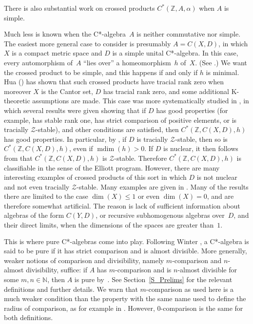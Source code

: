 \documentclass[10pt]{amsart}
\numberwithin{equation}{section}
\theoremstyle{definition}
\newcommand{\af}{\alpha}
\newcommand{\Z}{{\mathbb{Z}}}
\newcommand{\mdim}{{\operatorname{mdim}}}
\newcommand{\cZ}{{\mathcal{Z}}}
\newcommand{\ifo}{if and only if}
\newcommand{\ca}{C*-algebra}
\newcommand{\cms}{compact metric space}
\newcommand{\hme}{homeomorphism}
\begin{document}
There is also substantial work on crossed products
$C^* (\Z, A, \af)$ when $A$ is simple.

Much less is known when the \ca~$A$ is
neither commutative nor simple.
The easiest more general
case to consider is presumably $A = C (X, D)$, in which $X$
is a \cms{} and $D$ is a simple unital \ca.
In this case, every
automorphism of~$A$ ``lies over'' a \hme~$h$ of~$X$.
(See \cite{ArBcPh2}.)
We want the crossed product to be simple,
and this happens \ifo{} $h$ is minimal.
Hua (\cite{Hua}) has
shown that such crossed products have tracial rank zero
when moreover $X$ is the Cantor set, $D$ has tracial rank
zero, and some additional K-theoretic assumptions are made.
This case was more systematically studied in \cite{ArBcPh2},
in which several results were given showing that if $D$ has
good properties (for example, has stable rank one, has strict
comparison of positive elements, or is tracially $\cZ$-stable),
and other conditions are satisfied, then $C^* (\Z, C (X, D), h)$
has good properties.
In particular, by \cite[Theorem 4.5]{ArBcPh2},
if $D$ is tracially $\cZ$-stable, then so is $C^* (\Z, C (X, D), h)$,
even if $\mdim (h) > 0$.
If $D$ is nuclear, it then follows from
\cite[Theorem~4.1]{HirOr} that $C^* (\Z, C (X, D), h)$ is $\cZ$-stable.
Therefore $C^* (\Z, C (X, D), h)$ is classifiable
in the sense of the Elliott program.
However, there are many
interesting examples of crossed products of this sort in which
$D$ is not nuclear and not even tracially $\cZ$-stable.
Many examples are given in \cite[Section~6]{ArBcPh2}.
Many of the results there are limited to the case
$\dim (X) \leq 1$ or even $\dim (X) = 0$, and are
therefore somewhat artificial.
The reason is lack of
sufficient information about algebras of the form $C (Y, D)$,
or recursive subhomogenous algebras over~$D$, and their
direct limits, when the dimensions of the spaces are greater
than~$1$.

This is where pure C*-algebras come into play.
Following Winter \cite[Definition 3.6]{Wint2012}, a C*-algebra is said to be pure if it has strict comparison and is
almost divisible.
More generally, weaker notions of comparison and divisibility, namely $m$-comparison and $n$-almost divisibility, suffice: if $A$ has $m$-comparison and is $n$-almost divisible for some $m,n \in \mathbb{N}$, then $A$ is pure by~\cite[Theorem~5.7]{AnPrTlVt}.
See Section~\ref{S_Prelims} for the relevant definitions and further details.
We warn that $m$-comparison as used here is a much weaker condition
than the property
with the same name used to define the radius of comparison,
as for example in \cite[Definition 6.1]{Toms06}.
However, $0$-comparison is the same for both definitions.
\end{document}
